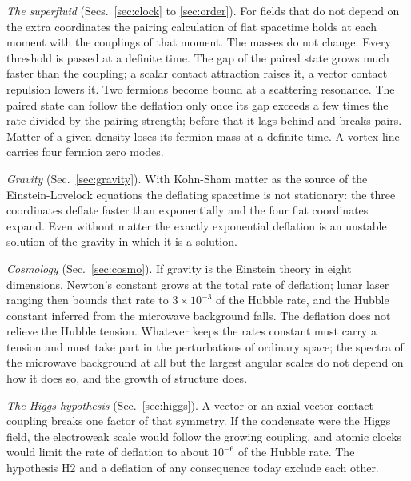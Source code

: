 \emph{The superfluid} (Secs.~\ref{sec:clock} to \ref{sec:order}). For fields that do not depend on
the extra coordinates the pairing calculation of flat spacetime holds at each moment with the
couplings of that moment. The masses do not change. Every threshold is passed at a definite time. The
gap of the paired state grows much faster than the coupling; a scalar contact attraction raises it,
a vector contact repulsion lowers it. Two fermions become bound at a scattering resonance. The
paired state can follow the deflation only once its gap exceeds a few times the rate divided by the
pairing strength; before that it lags behind and breaks pairs. Matter of a given density loses its
fermion mass at a definite time. A vortex line carries four fermion zero modes.

\emph{Gravity} (Sec.~\ref{sec:gravity}). With Kohn-Sham matter as the source of the Einstein-Lovelock
equations the deflating spacetime is not stationary: the three coordinates deflate faster than
exponentially and the four flat coordinates expand. Even without matter the exactly exponential
deflation is an unstable solution of the gravity in which it is a solution.

\emph{Cosmology} (Sec.~\ref{sec:cosmo}). If gravity is the Einstein theory in eight dimensions,
Newton's constant grows at the total rate of deflation; lunar laser ranging then bounds that rate to
$3\times10^{-3}$ of the Hubble rate, and the Hubble constant inferred from the microwave background
falls. The deflation does not relieve the Hubble tension. Whatever keeps the rates constant must
carry a tension and must take part in the perturbations of ordinary space; the spectra of the
microwave background at all but the largest angular scales do not depend on how it does so, and
the growth of structure does.

\emph{The Higgs hypothesis} (Sec.~\ref{sec:higgs}).  A vector or an axial-vector contact coupling breaks one factor of that symmetry. If the
condensate were the Higgs field, the electroweak scale would follow the growing coupling, and atomic
clocks would limit the rate of deflation to about $10^{-6}$ of the Hubble rate. The hypothesis H2 and
a deflation of any consequence today exclude each other.

